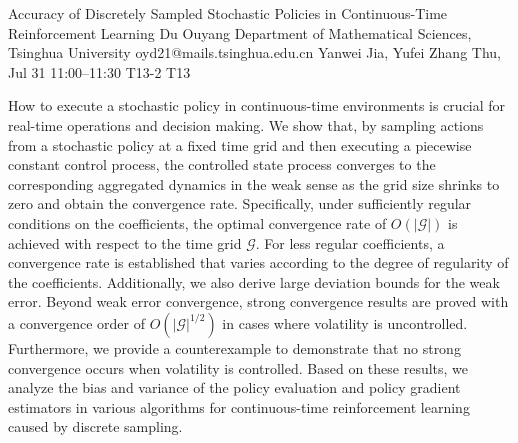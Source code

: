 \begin{talk}
  {Accuracy of Discretely Sampled Stochastic Policies in Continuous-Time Reinforcement Learning}%
  {Du Ouyang}%
  {Department of Mathematical Sciences, Tsinghua University}%
  {oyd21@mails.tsinghua.edu.cn}%
  {Yanwei Jia, Yufei Zhang}%
  {}%
  {Thu, Jul 31 11:00–11:30}%
  {T13-2}%
  {T13}%
  
				
			


\medskip

How to execute a stochastic policy in continuous-time environments is crucial for real-time operations and decision making. We show that, by sampling actions from a stochastic policy at a fixed time grid and then executing a piecewise constant control process, the controlled state process converges to the corresponding aggregated dynamics in the weak sense as the grid size shrinks to zero and obtain the convergence rate. Specifically, under sufficiently regular conditions on the coefficients, the optimal convergence rate of $O(|\mathscr{G}|)$ is achieved with respect to the time grid $\mathscr{G}$. For less regular coefficients, a convergence rate is established that varies according to the degree of regularity of the coefficients. Additionally, we also derive large deviation bounds for the weak error. Beyond weak error convergence, strong convergence results are proved with a convergence order of $O(|\mathscr{G}|^{1/2})$ in cases where volatility is uncontrolled. Furthermore, we provide a counterexample to demonstrate that no strong convergence occurs when volatility is controlled. Based on these results, we analyze the bias and variance of the policy evaluation and policy gradient estimators in various algorithms for continuous-time reinforcement learning caused by discrete sampling.


\end{talk}

